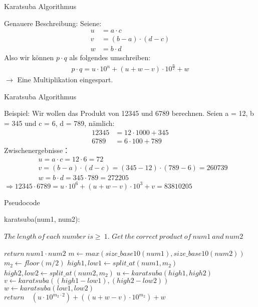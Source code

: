 \documentclass{beamer}
\begin{document}
\begin{frame}{Karatsuba Algorithmus}
\begin{block}{Genauere Beschreibung: }
Seiene: 
\begin{align*}
u &= a \cdot c\\
v &= (b - a) \cdot (d - c)\\
w &= b \cdot d
\end{align*}
Also wir können $p \cdot q$ als folgendes umschreiben: 
\begin{align*}
p \cdot q = u \cdot 10^{n} + (u + w - v) \cdot 10^{\frac{n}{2}} + w
\end{align*}
$\rightarrow$ Eine Multiplikation eingespart.
\end{block}
\end{frame}

\begin{frame}{Karatsuba Algorithmus}
    \begin{block}{Beispiel: }
    Wir wollen das Produkt von 12345 und 6789 berechnen. Seien a = 12, b = 345 und c = 6, d = 789, nämlich:
\begin{align*}
12345 &= 12 \cdot 1000 + 345\\
6789 &= 6 \cdot 100 + 789
\end{align*}
Zwischenergebnisse：
\begin{align*}
&u = a \cdot c = 12 \cdot 6 = 72\\
&v = (b - a) \cdot (d - c) = (345 - 12) \cdot (789 - 6) = 260739\\
&w = b \cdot d = 345 \cdot 789 = 272205
\end{align*}
$\Rightarrow 12345 \cdot 6789 = u \cdot 10^{6} + (u + w - v) \cdot 10^{3} + v = 83810205$
    \end{block}
\end{frame}

\begin{frame}{Pseudocode}
\begin{algorithm}[H]                           %
\caption{karatsuba(num1, num2):}          %
\label{alg1}      %
\begin{algorithmic}  %
\REQUIRE $The \ length \ of \ each \ number \ is \geq \ 1.$
\ENSURE $Get \ the \ correct \ product \ of \ num1 \ and \ num2$

\STATE $return \ num1 \cdot num2$
\ELSE
\STATE $m \leftarrow max(size\_base10(num1), size\_base10(num2))$
\STATE $m_2 \leftarrow floor(m / 2) $
\STATE $high1, low1 \leftarrow split\_at(num1, m_2)$
\STATE $high2, low2 \leftarrow split\_at(num2, m_2)$
\STATE $u \leftarrow karatsuba(high1, high2)$
\STATE $v \leftarrow karatsuba((high1-low1), (high2-low2))$
\STATE $w \leftarrow karatsuba(low1, low2)$
\STATE $return \quad (u \cdot 10^{m_2 \cdot 2}) + ((u + w - v) \cdot 10 ^{m_2}) + w$
\ENDIF
\end{algorithmic}
\end{algorithm}
\end{frame}
\end{document}
